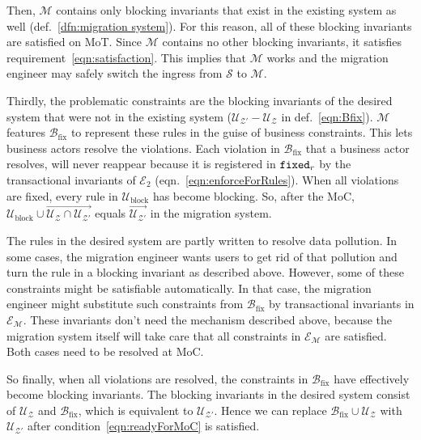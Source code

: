 \documentclass[runningheads]{llncs}
\newcommand{\rules}{\mathcal{U}}
\newcommand{\transactions}{\mathcal{E}}
\newcommand{\busConstraints}{\mathcal{B}}
\newcommand{\schema}{\mathscr{Z}}
\newcommand{\migrsys}{\mathscr{M}}
\newcommand{\infsys}{\mathscr{S}}
\begin{document}
   Then, $\migrsys$ contains only blocking invariants that exist in the existing system as well (def.~\ref{dfn:migration system}).
   For this reason, all of these blocking invariants are satisfied on MoT.
   Since $\migrsys$ contains no other blocking invariants, it satisfies requirement~\ref{eqn:satisfaction}.
   This implies that $\migrsys$ works and the migration engineer may safely switch the ingress from $\infsys$ to $\migrsys$.

   Thirdly, the problematic constraints are the blocking invariants of the desired system that were not in the existing system ($\rules_{\schema'}-\rules_{\schema}$ in def.~\ref{eqn:Bfix}).
   $\migrsys$ features $\busConstraints_\text{fix}$ to represent these rules in the guise of business constraints.
   This lets business actors resolve the violations.
   Each violation in $\busConstraints_\text{fix}$ that a business actor resolves,
   will never reappear because it is registered in ${\tt fixed}_r$ by the transactional invariants of $\transactions_2$ (eqn.~\ref{eqn:enforceForRules}).
   When all violations are fixed, every rule in $\rules_\text{block}$ has become blocking.
   So, after the MoC, $\rules_\text{block}\cup\overrightarrow{\rules_{\schema}\cap\rules_{\schema'}}$ equals $\overrightarrow{\rules_{\schema'}}$ in the migration system.

   The rules in the desired system are partly written to resolve data pollution.
   In some cases, the migration engineer wants users to get rid of that pollution and turn the rule in a blocking invariant as described above.
   However, some of these constraints might be satisfiable automatically.
   In that case, the migration engineer might substitute such constraints from $\busConstraints_\text{fix}$ by transactional invariants in $\transactions_{\migrsys}$.
   These invariants don't need the mechanism described above, because the migration system itself will take care that all constraints in $\transactions_{\migrsys}$ are satisfied.
   Both cases need to be resolved at MoC.

   So finally, when all violations are resolved, the constraints in $\busConstraints_\text{fix}$ have effectively become blocking invariants.
   The blocking invariants in the desired system consist of $\rules_{\schema}$ and $\busConstraints_\text{fix}$, which is equivalent to $\rules_{\schema'}$.
   Hence we can replace $\busConstraints_\text{fix}\cup\rules_{\schema}$ with $\rules_{\schema'}$ after condition~\ref{eqn:readyForMoC} is satisfied.
\end{document}
